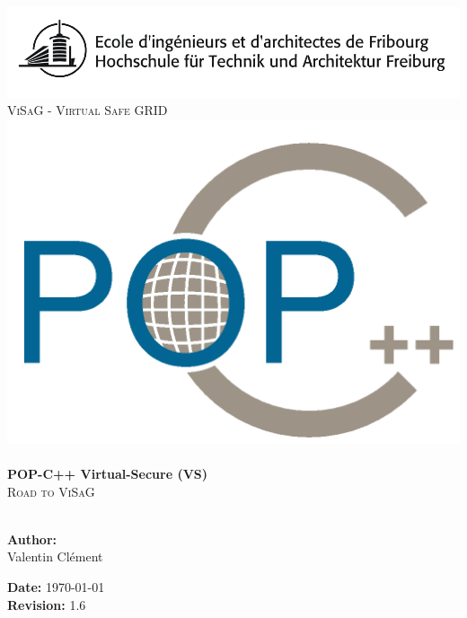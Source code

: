 
\begin{titlepage}
 
\begin{center}
\includegraphics[scale=0.3]{logo_eif.png}\\[1.5cm]
\textsc{\LARGE ViSaG - Virtual Safe GRID}\\[1.5cm]

\includegraphics[scale=0.3]{pic/logo_pop.png}\\[2cm]


\HRule \\[1cm]
{ \huge \bfseries POP-C++ Virtual-Secure (VS)}\\[0.5cm]
\textsc{\LARGE Road to ViSaG}\\[1cm]
 
\HRule \\[5cm]
 
\begin{minipage}{0.4\textwidth}
\begin{flushleft} \large
\textbf{Author:}\\
Valentin Clément
\end{flushleft}
\end{minipage}
\begin{minipage}{0.4\textwidth}
\begin{flushright} \large
\textbf{Date:} \today \\

\textbf{Revision:} 1.6
\end{flushright}
\end{minipage}
 
\vfill
  
\end{center}
 
\end{titlepage}
